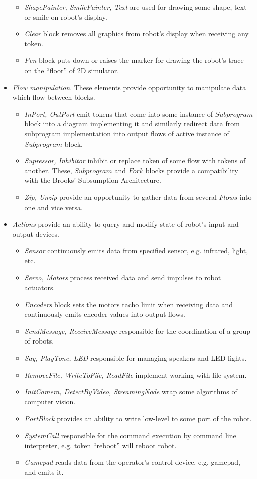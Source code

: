 \documentclass[conference,compsoc]{IEEEtran}
\begin{document}
\begin{itemize}
\begin{itemize}
\item \textit{ShapePainter, SmilePainter, Text} are used for drawing some shape, text or smile on robot's display. 
\item \textit{Clear} block removes all graphics from robot's display when receiving any token.
\item \textit{Pen} block puts down or raises the marker for drawing the robot's trace on the ``floor'' of 2D simulator.
\end{itemize} 
\item \textit{Flow manipulation}. These elements provide opportunity to manipulate data which flow between blocks.
\begin{itemize}
\item \textit{InPort, OutPort} emit tokens that come into some instance of $Subprogram$ block into a diagram implementing it and similarly redirect data from subprogram implementation into output flows of active instance of $Subprogram$ block.
\item \textit{Supressor, Inhibitor} inhibit or replace token of some flow with tokens of another. These, $Subprogram$ and $Fork$ blocks provide a compatibility with the Brooks' Subsumption Architecture.
\item \textit{Zip, Unzip} provide an opportunity to gather data from several $Flows$ into one and vice versa.
\end{itemize} 
\item \textit{Actions} provide an ability to query and modify state of robot's input and output devices.
\begin{itemize}
\item \textit{Sensor} continuously emits data from specified sensor, e.g. infrared, light, etc.
\item \textit{Servo, Motors} process received data and send impulses to robot actuators.
\item \textit{Encoders} block sets the motors tacho limit when receiving data and continuously emits encoder values into output flows.
\item \textit{SendMessage, ReceiveMessage} responsible for the coordination of a group of robots.
\item \textit{Say, PlayTone, LED} responsible for managing speakers and LED lights.
\item \textit{RemoveFile, WriteToFile, ReadFile} implement working with file system.
\item \textit{InitCamera, DetectByVideo, StreamingNode} wrap some algorithms of computer vision.
\item \textit{PortBlock} provides an ability to write low-level to some port of the robot.
\item \textit{SystemCall} responsible for the command execution by command line interpreter, e.g. token ``reboot'' will reboot robot.
\item \textit{Gamepad} reads data from the operator's control device, e.g. gamepad, and emits it.
\end{itemize} 
\end{itemize} 
\end{document}
